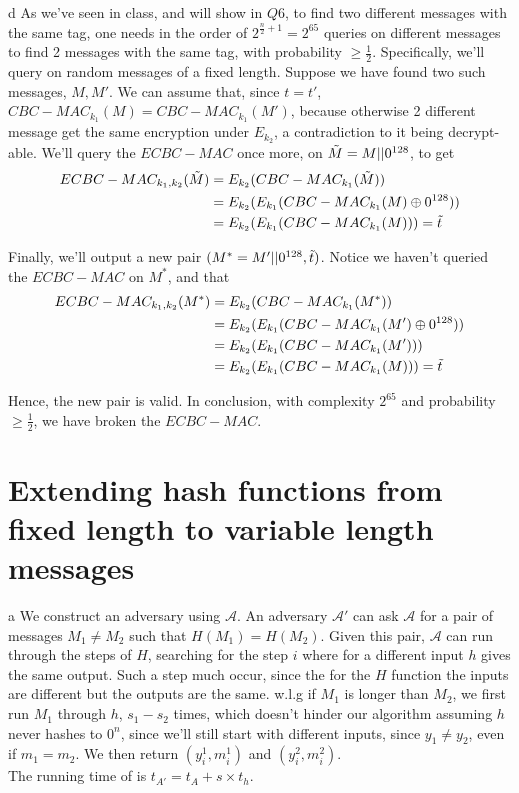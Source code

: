 \documentclass{article}
\begin{document}
\begin{paragraph}
    d As we've seen in class, and will show in $Q6$, to find two different messages with the same tag, one needs in the order of $2^{\frac{n}{2} + 1} = 2^{65}$ queries on different messages to find 2 messages with the same tag, with probability $\geq \frac{1}{2}$. Specifically, we'll query on random messages of a fixed length. Suppose we have found two such messages, $M, M'$. We can assume that, since $t = t'$, $CBC-MAC_{k_1}(M) = CBC-MAC_{k_1}(M')$, because otherwise 2 different message get the same encryption under $E_{k_2}$, a contradiction to it being decrypt-able. We'll query the $ECBC-MAC$ once more, on $\Tilde{M} = M || 0^{128}$, to get
    \begin{align*}
        ECBC-MAC_{k_1, k_2}(\Tilde{M}) &= E_{k_2}(CBC-MAC_{k_1}(\Tilde{M}))\\
        &= E_{k_2}(E_{k_1}(CBC-MAC_{k_1}(M) \oplus 0^{128}))\\
        &= E_{k_2}(E_{k_1}(CBC-MAC_{k_1}(M))) = \Tilde{t}
    \end{align*}
    
    Finally, we'll output a new pair $(M^* = M' || 0^{128}, \Tilde{t})$. Notice we haven't queried the $ECBC-MAC$ on $M^*$, and that
    \begin{align*}
        ECBC-MAC_{k_1, k_2}(M^*) &= E_{k_2}(CBC-MAC_{k_1}(M^*))\\
        &= E_{k_2}(E_{k_1}(CBC-MAC_{k_1}(M') \oplus 0^{128}))\\
        &= E_{k_2}(E_{k_1}(CBC-MAC_{k_1}(M')))\\
        &= E_{k_2}(E_{k_1}(CBC-MAC_{k_1}(M))) = \Tilde{t}
    \end{align*}
    
    Hence, the new pair is valid. In conclusion, with complexity $2^{65}$ and probability $\geq \frac{1}{2}$, we have broken the $ECBC-MAC$.
\end{paragraph}
\newpage

\section{Extending hash functions from fixed length to variable length messages}
\begin{paragraph}
	a We construct an adversary using $\mathcal{A}$. An adversary $\mathcal{A'}$ can
	ask $\mathcal{A}$ for a pair of messages $M_1 \neq M_2$ such that $H(M_1) = H(M_2)$.
	Given this pair, $\mathcal{A}$ can run through the steps of $H$,
	searching for the step $i$ where for a different input $h$ gives the same output.
	Such a step much occur, since the for the $H$ function the inputs are different
	but the outputs are the same.
	w.l.g if $M_1$ is longer than $M_2$, we first run $M_1$ through $h$, $s_1 - s_2$
	times, which doesn't hinder our	algorithm assuming $h$ never hashes to $0^n$, since 
	we'll still start with different inputs, since $y_1 \neq y_2$, even if $m_1 = m_2$.
	We then return $(y_i^1, m_i^1)$ and $(y_i^2, m_i^2)$.\\
	The running time of is $t_{A'} = t_A + s\times t_h$.
\end{paragraph}
\end{document}

